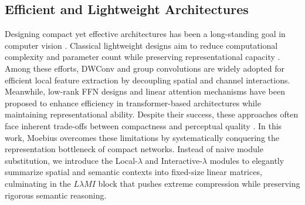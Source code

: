 \documentclass{llmxive}
\begin{document}
\subsection{Efficient and Lightweight Architectures}
\vspace{-0.5em}
Designing compact yet effective architectures has been a long-standing goal in computer vision \cite{qin2024mobilenetv4}. Classical lightweight designs aim to reduce computational complexity and parameter count while preserving representational capacity \cite{li2022efficientformerv2}.
Among these efforts, DWConv \cite{Sandler2018MobileNetV2, tan2019efficientnet} and group convolutions \cite{zhang2018shufflenet} are widely adopted for efficient local feature extraction by decoupling spatial and channel interactions.
Meanwhile, low-rank FFN designs \cite{vaswani2017attention, shazeer2020glu, xie2024sana, xue2024openmoe, cai2023efficientvit} and linear attention mechanisms \cite{yang2024fla, yang2024gla, dao2022flashattention,Xu2024MoSt-DSA,xu2025garamost,bello2021lambdanetworks} have been proposed to enhance efficiency in transformer-based architectures \cite{xie2024sana, Peebles2022DiT, esser2024SD3, Zhu2025DiG} while maintaining representational ability.
Despite their success, these approaches often face inherent trade-offs between compactness and perceptual quality \cite{yao2025vavae}.
In this work, Moebius overcomes these limitations by systematically conquering the representation bottleneck of compact networks. Instead of naive module substitution, we introduce the Local-$\lambda$ and Interactive-$\lambda$ modules to elegantly summarize spatial and semantic contexts into fixed-size linear matrices, culminating in the $L\lambda MI$ block that pushes extreme compression while preserving rigorous semantic reasoning.
\vspace{-0.5em}

\vspace{-0.5em}
\end{document}
